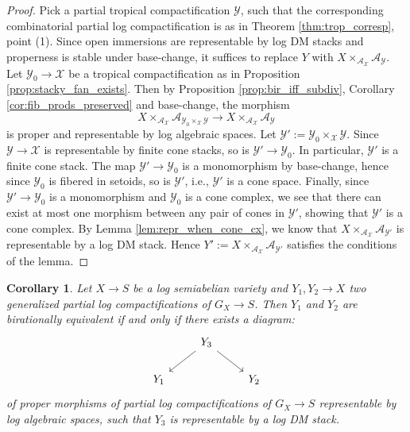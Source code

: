 \documentclass[11pt]{amsart}
\newtheorem{corollary}[theorem]{Corollary}
\theoremstyle{definition}
\theoremstyle{remark}
\begin{document}
\begin{proof}
	Pick a partial tropical compactification $\mathcal{Y}$, such that the corresponding combinatorial partial log compactification is as in Theorem \ref{thm:trop_corresp}, point (1).
	Since open immersions are representable by log DM stacks and properness is stable under base-change, it suffices to replace
	$Y$ with $X\times_{\mathcal{A}_{\mathcal{X}}}\mathcal{A}_{\mathcal{Y}}$.
	Let $\mathcal{Y}_0\to \mathcal{X}$ be a tropical compactification as in Proposition \ref{prop:stacky_fan_exists}.
	Then by Proposition \ref{prop:bir_iff_subdiv}, Corollary
	\ref{cor:fib_prods_preserved} and base-change, the morphism
	$$X\times_{\mathcal{A}_{\mathcal{X}}}\mathcal{A}_{\mathcal{Y}_0\times_{\mathcal{X}}\mathcal{Y}}\to X\times_{\mathcal{A}_{\mathcal{X}}}\mathcal{A}_{\mathcal{Y}}$$
	is proper and representable by log algebraic spaces.
	Let $\mathcal{Y}':=\mathcal{Y}_0\times_{\mathcal{X}}\mathcal{Y}$.
	Since $\mathcal{Y}\to \mathcal{X}$ is representable by finite cone stacks, so
	is $\mathcal{Y}'\to \mathcal{Y}_0$. In particular, $\mathcal{Y}'$ is a finite cone stack.
	The map $\mathcal{Y}'\to \mathcal{Y}_0$ is a monomorphism by base-change, hence since $\mathcal{Y}_0$
	is fibered in setoids, so is $\mathcal{Y}'$, i.e., $\mathcal{Y}'$ is a cone space. Finally, since
	$\mathcal{Y}'\to \mathcal{Y}_0$ is a monomorphism and $\mathcal{Y}_0$ is a cone complex, we see that
	there can exist at most one morphism between any pair of cones in $\mathcal{Y}'$, showing that $\mathcal{Y}'$
	is a cone complex.
	By Lemma \ref{lem:repr_when_cone_cx}, we know that
	$X\times_{\mathcal{A}_{\mathcal{X}}}\mathcal{A}_{\mathcal{Y}'}$ is representable
	by a log DM stack. Hence $Y':=X\times_{\mathcal{A}_{\mathcal{X}}}\mathcal{A}_{\mathcal{Y}'}$
	satisfies the conditions of the lemma.
\end{proof}

\begin{corollary}
	\label{cor:bir_can_assume_repr}
	Let $X\to S$ be a log semiabelian variety and $Y_1,Y_2\to X$ two
	generalized partial log compactifications of $G_X\to S$. Then $Y_1$ and $Y_2$ are birationally
	equivalent if and only if there exists a diagram:
	$$\begin{tikzcd}
		&Y_3\arrow[dr]\arrow[dl]&\\
		Y_1&&Y_2
	\end{tikzcd}$$
	of proper morphisms of partial log compactifications of $G_X\to S$
	representable by log algebraic spaces, such that $Y_3$ is representable
	by a log DM stack.
\end{corollary}
\end{document}
